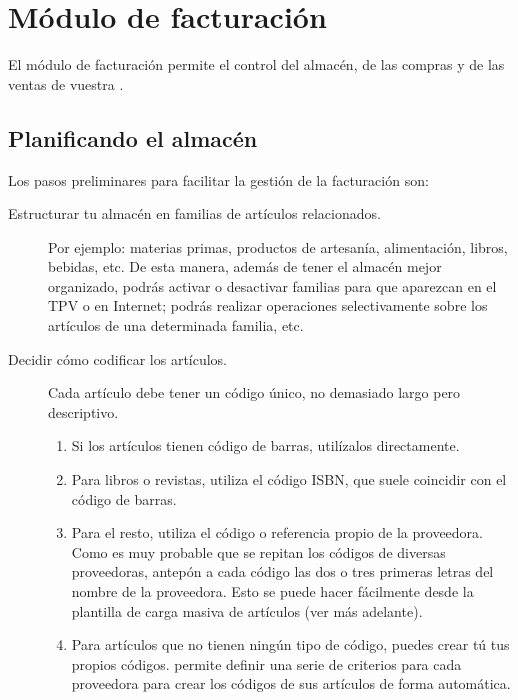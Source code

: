 \chapter{Módulo de facturación}

% 
% 

El módulo de facturación permite el control del almacén, de las compras y de las ventas de vuestra \organizacion.

\section{Planificando el almacén}


Los pasos preliminares para facilitar la gestión de la facturación son:

\begin{description}
 \item [Estructurar tu almacén en familias de artículos relacionados.]
Por ejemplo: materias primas, productos de artesanía, alimentación, libros, bebidas, etc. De esta manera, además de tener el almacén mejor organizado, podrás activar o desactivar familias para que aparezcan en el TPV o en Internet; podrás realizar operaciones selectivamente sobre los artículos de una determinada familia, etc. 
 \item [Decidir cómo codificar los artículos.]
Cada artículo debe tener un código único, no demasiado largo pero descriptivo. 

\begin{enumerate}
\item {Si los artículos tienen código de barras, utilízalos directamente.}
\item {Para libros o revistas, utiliza el código ISBN, que suele coincidir con el código de barras.}
\item {Para el resto, utiliza el código o referencia propio de la proveedora. Como es muy probable que se repitan los códigos de diversas proveedoras, antepón a cada código las dos o tres primeras letras del nombre de la proveedora. Esto se puede hacer fácilmente desde la plantilla de carga masiva de artículos (ver más adelante)}.
\item {Para artículos que no tienen ningún tipo de código, puedes crear tú tus propios códigos. \appname permite definir una serie de criterios para cada proveedora para crear los códigos de sus artículos de forma automática.}
\end{enumerate}

\end{description}

